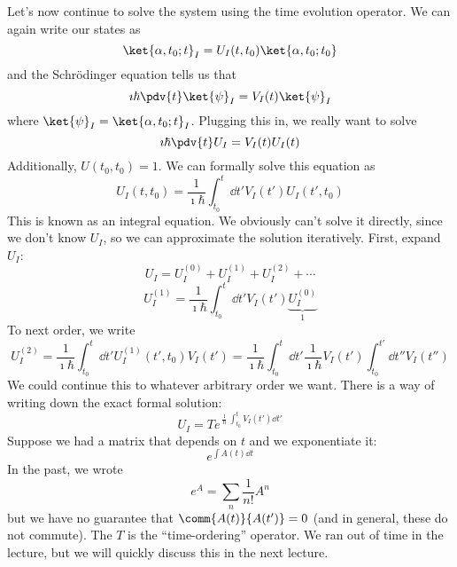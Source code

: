 \documentclass[a4paper,twoside,master.tex]{subfiles}
\begin{document}
Let's now continue to solve the system using the time evolution operator. We can again write our states as
\begin{equation}
    \ket{\alpha, t_0; t}_I = U_I(t, t_0)\ket{\alpha, t_0 ; t_0 }
\end{equation}
and the Schr\"odinger equation tells us that
\begin{equation}
    \imath \hbar \pdv{t}\ket{\psi}_I = V_I(t)\ket{\psi}_I
\end{equation}
where $\ket{\psi}_I =\ket{\alpha, t_0; t}_I $. Plugging this in, we really want to solve
\begin{equation}
    \imath \hbar \pdv{t} U_I = V_I(t) U_I(t)
\end{equation}
Additionally, $ U(t_0, t_0) = 1 $. We can formally solve this equation as
\begin{equation}
    U_I(t, t_0) = \frac{1}{\imath \hbar} \int_{t_0}^{t} \dd{t'} V_I(t') U_I(t', t_0)
\end{equation}
This is known as an integral equation. We obviously can't solve it directly, since we don't know $ U_I $, so we can approximate the solution iteratively. First, expand $ U_I $:
\begin{equation}
    U_I = U_I^{(0)} + U_I^{(1)} + U_I^{(2)} + \cdots
\end{equation}
\begin{equation}
    U_I^{(1)} = \frac{1}{\imath \hbar} \int_{t_0}^{t} \dd{t'} V_I(t') \underbrace{U_I^{(0)}}_{1}
\end{equation}
To next order, we write
\begin{equation}
    U_{I}^{(2)} = \frac{1}{\imath \hbar} \int_{t_0}^{t} \dd{t'} U_I^{(1)}(t', t_0) V_I(t') = \frac{1}{\imath \hbar} \int_{t_0}^{t} \dd{t'} \frac{1}{\imath \hbar} V_I(t') \int_{t_0}^{t'} \dd{t''} V_I(t'')
\end{equation}
We could continue this to whatever arbitrary order we want. There is a way of writing down the exact formal solution:
\begin{equation}
    U_I = T e^{\frac{\imath}{\hbar} \int_{t_0}^{t} V_I(t') \dd{t'}}
\end{equation}
Suppose we had a matrix that depends on $ t $ and we exponentiate it:
\begin{equation}
    e^{\int A(t) \dd{t}}
\end{equation}
In the past, we wrote
\begin{equation}
    e^{A} = \sum_n \frac{1}{n!} A^n
\end{equation}
but we have no guarantee that $ \comm{A(t)}{A(t')} = 0 $ (and in general, these do not commute).
The $ T $ is the ``time-ordering'' operator. We ran out of time in the lecture, but we will quickly discuss this in the next lecture.
\end{document}
